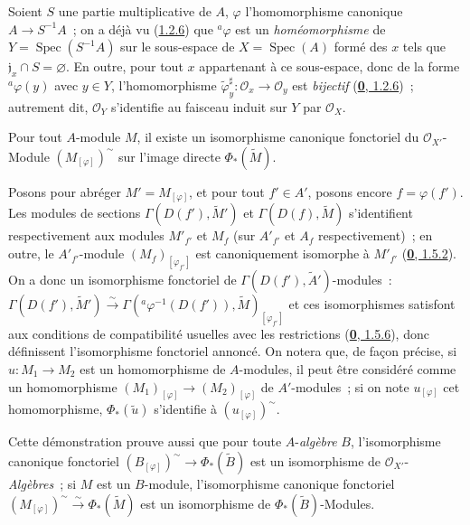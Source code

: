 \begin{example}[1.6.2]
\label{I.1.6.2-fr}
Soient $S$ une partie multiplicative de $A$, $\varphi$ l'homomorphisme
canonique $A\to S^{-1}A$~; on a déjà vu
(\hyperref[I.1.2.6-fr]{1.2.6}) que ${}^a\varphi$ est un
\emph{homéomorphisme} de $Y=\operatorname{Spec}(S^{-1}A)$ sur le
sous-espace de $X=\operatorname{Spec}(A)$ formé des $x$ tels que
$\mathfrak{j}_x\cap S=\varnothing$. En outre, pour tout $x$ appartenant à
ce sous-espace, donc de la forme ${}^a\varphi(y)$ avec $y\in Y$,
l'homomorphisme
$\widetilde{\varphi}_y^{\sharp}:\mathscr{O}_x\to\mathscr{O}_y$ est
\emph{bijectif} (\hyperref[0.1.2.6-fr]{\textbf{0}, 1.2.6})~; autrement dit,
$\mathscr{O}_Y$ s'identifie au faisceau induit sur $Y$ par $\mathscr{O}_X$.
\end{example}

\begin{proposition}[1.6.3]
\label{I.1.6.3-fr}
Pour tout $A$-module $M$, il existe un isomorphisme canonique fonctoriel du
$\mathscr{O}_{X'}$-Module $(M_{[\varphi]})^{\sim}$ sur l'image directe
$\Phi_*(\widetilde{M})$.
\end{proposition}

Posons pour abréger $M'=M_{[\varphi]}$, et pour tout $f'\in A'$, posons
encore $f=\varphi(f')$. Les modules de sections
$\Gamma(D(f'),\widetilde{M}')$ et $\Gamma(D(f),\widetilde{M})$
s'identifient respectivement aux modules $M'_{f'}$ et $M_f$ (sur
$A'_{f'}$ et $A_f$ respectivement)~; en outre, le $A'_{f'}$-module
$(M_f)_{[\varphi_{f'}]}$ est canoniquement isomorphe à $M'_{f'}$
(\hyperref[0.1.5.2-fr]{\textbf{0}, 1.5.2}). On a donc un isomorphisme fonctoriel de
$\Gamma(D(f'),\widetilde{A}')$-modules~:
$\Gamma(D(f'),\widetilde{M}')\xrightarrow{\sim}
\Gamma({}^a\varphi^{-1}(D(f')),\widetilde{M})_{[\varphi_{f'}]}$ et ces
isomorphismes satisfont aux conditions de compatibilité usuelles avec les
restrictions (\hyperref[0.1.5.6-fr]{\textbf{0}, 1.5.6}), donc définissent
l'isomorphisme fonctoriel annoncé. On notera que, de façon précise, si
$u:M_1\to M_2$ est un homomorphisme de $A$-modules, il peut être considéré
comme un homomorphisme $(M_1)_{[\varphi]}\to(M_2)_{[\varphi]}$ de
$A'$-modules~; si on note $u_{[\varphi]}$ cet homomorphisme,
$\Phi_*(\widetilde{u})$ s'identifie à $(u_{[\varphi]})^{\sim}$.

Cette démonstration prouve aussi que pour toute $A$-\emph{algèbre} $B$,
l'isomorphisme
canonique fonctoriel
$(B_{[\varphi]})^{\sim}\to\Phi_*(\widetilde{B})$ est un
isomorphisme de $\mathscr{O}_{X'}$-\emph{Algèbres}~; si $M$ est un $B$-module,
l'isomorphisme canonique fonctoriel
$(M_{[\varphi]})^{\sim}\xrightarrow{\sim}\Phi_*(\widetilde{M})$ est un
isomorphisme de $\Phi_*(\widetilde{B})$-Modules.

